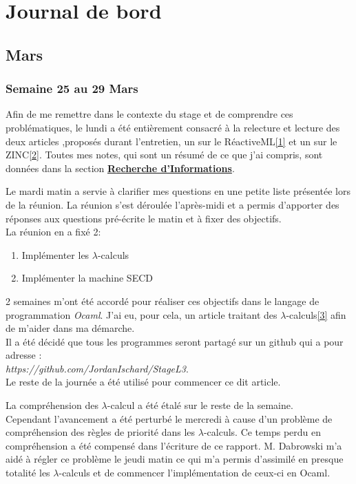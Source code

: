 \documentclass[10pt,a4paper]{article}
\begin{document}
		\section{Journal de bord}
		\subsection{Mars}
		\subsubsection{Semaine 25 au 29 Mars}
		\medbreak
		Afin de me remettre dans le contexte du stage et de comprendre ces problématiques, le lundi a été entièrement consacré à la relecture et lecture des deux articles ,proposés durant l'entretien, un sur le RéactiveML\hyperref[ReactiveML]{[1]} et un sur le ZINC\hyperref[ZINC]{[2]}.
		\medbreak
		Toutes mes notes, qui sont un résumé de ce que j'ai compris, sont données dans la section \hyperref[Recherche]{\textbf{Recherche d'Informations}}.
		\medbreak
		
		Le mardi matin a servie à clarifier mes questions en une petite liste présentée lors de la réunion. La réunion s'est déroulée l'après-midi et a permis d'apporter des réponses aux questions pré-écrite le matin et à fixer des objectifs. 
		\\La réunion en a fixé 2:
		\smallbreak
		\begin{enumerate}
			\item Impl\'{e}menter les $\lambda$-calculs
			\item Impl\'{e}menter la machine SECD
		\end{enumerate}
		2 semaines m'ont été accordé pour réaliser ces objectifs dans le langage de programmation \textit{Ocaml}. J'ai eu, pour cela, un article traitant des $\lambda$-calculs\hyperref[Calculi]{[3]} afin de m'aider dans ma démarche.\\
		Il a été décidé que tous les programmes seront partagé sur un github qui a pour adresse :\\ \textit{https://github.com/JordanIschard/StageL3}.\\
		Le reste de la journée a été utilisé pour commencer ce dit article.
		\medbreak
		
		La compréhension des $\lambda$-calcul a été étalé sur le reste de la semaine.
		\\
		Cependant l'avancement a été perturbé le mercredi à cause d'un problème de compréhension des règles de priorité dans les $\lambda$-calculs. Ce temps perdu en compréhension a été compensé dans l'écriture de ce rapport.
		\medbreak
		M. Dabrowski m'a aidé à régler ce problème le jeudi matin ce qui m'a permis d'assimilé en presque totalité les $\lambda$-calculs et de commencer l'implémentation de ceux-ci en Ocaml.
		
\end{document}
